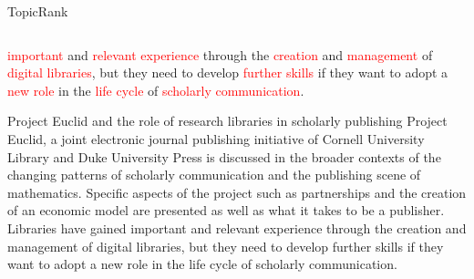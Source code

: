 \begin{frame}[label=topicrank]{TopicRank}
\begin{columns}
\begin{column}{.56\textwidth}
{{\begin{exampleblock}
                \textcolor{red}{important} and \textcolor{red}{relevant
                experience} through the \textcolor{red}{creation} and
                \textcolor{red}{management} of \textcolor{red}{digital
                libraries}, but they need to develop \textcolor{red}{further
                skills} if they want to adopt a \textcolor{red}{new role} in the
                \textcolor{red}{life cycle} of \textcolor{red}{scholarly
                communication}.
              \end{exampleblock}
            }
          }{ %
            \begin{exampleblock}{\footnotesize Project Euclid and the role of
                                 research libraries in scholarly publishing}
              \justifying
              \footnotesize Project Euclid, a joint electronic journal
              publishing initiative of Cornell University Library and Duke
              University Press is discussed in the broader contexts of the
              changing patterns of scholarly communication and the publishing
              scene of mathematics. Specific aspects of the project such as
              partnerships and the creation of an economic model are presented
              as well as what it takes to be a publisher. Libraries have gained
              important and relevant experience through the creation and
              management of digital libraries, but they need to develop further
              skills if they want to adopt a new role in the life cycle of
              scholarly communication.
            \end{exampleblock}
          }
        \endminipage
      \end{column}
    \end{columns}
  \end{frame}

